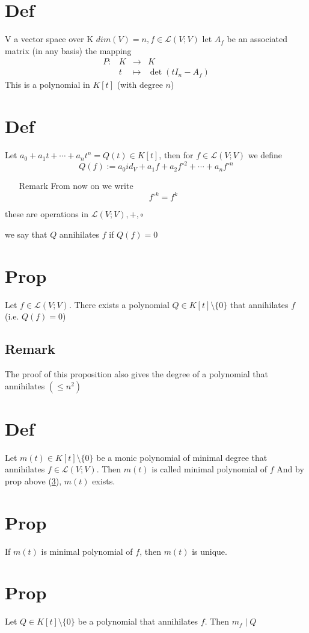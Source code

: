 \documentclass{book}
\begin{document}
\section{Def}
V a vector space over K $dim(V)=n,f\in \mathscr{L}(V;V)$ let $A_f$ be an associated matrix (in any basis) the mapping
$$\begin{aligned}
    P: &K &\rightarrow& K\\&t&\mapsto& \det(tI_n-A_f)
\end{aligned}$$
This is a polynomial in $K[t]$ (with degree $n$)
\section{Def}
Let $a_0+a_1t+\cdots+a_nt^n= Q(t)\in K[t]$, then for $f\in \mathscr{L}(V;V)$ we define 
$$Q(f):=a_0id_V+a_1f+a_2f^{\circ 2}+\cdots+a_nf^{\circ n}$$
\begin{itemize}
    \item[Remark]
From now on we write
$$f^{\circ k}=f^k$$
\end{itemize}
these are operations in $\mathscr{L}(V;V),+,\circ$

we say that $Q$ annihilates $f$ if $Q(f)=0$
\section{Prop}
\label{Prop.48.17}
Let $f\in \mathscr{L}(V;V)$. There exists a polynomial $Q\in K[t]\setminus\{0\}$ that annihilates $f$ (i.e. $Q(f)=0$)
\subsection*{Remark}The proof of this proposition also gives the degree of a polynomial that annihilates $(\leq n^2)$
\section{Def}
Let $m(t)\in K[t]\setminus\{0\}$ be a monic polynomial of minimal degree that annihilates $f\in \mathscr{L}(V;V)$. Then $m(t)$ is called minimal polynomial of $f$
And by prop above (\ref{Prop.48.17}), $m(t)$ exists.
\section{Prop}
If $m(t)$ is minimal polynomial of $f$, then $m(t)$ is unique.
\section{Prop}
Let $Q\in K[t]\setminus\{0\}$ be a polynomial that annihilates $f$. Then $m_f\mid Q$ 
\end{document}
